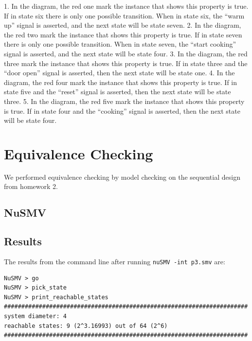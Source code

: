 \documentclass[11pt]{article}
\begin{document}
1. In the diagram, the red one mark the instance that shows this property is true. If in state six there is only one possible transition. When in state six, the “warm up” signal is asserted, and the next state will be state seven.
2. In the diagram, the red two mark the instance that shows this property is true. If in state seven there is only one possible transition. When in state seven, the “start cooking” signal is asserted, and the next state will be state four.
3. In the diagram, the red three mark the instance that shows this property is true. If in state three and the “door open” signal is asserted, then the next state will be state one.
4. In the diagram, the red four mark the instance that shows this property is true.  If in state five and the “reset” signal is asserted, then the next state will be state three.
5. In the diagram, the red five mark the instance that shows this property is true.  If in state four and the “cooking” signal is asserted, then the next state will be state four.
	
	

%

\section{Equivalence Checking} 
We performed equivalence checking by model checking on the sequential design from homework 2.
\subsection{NuSMV}
\subsection{Results}

The results from the command line after running \texttt{nuSMV -int p3.smv} are:
 \begin{lstlisting}[caption=NuSMV Interactive Output, label=p3_out]	
NuSMV > go
NuSMV > pick_state
NuSMV > print_reachable_states
######################################################################
system diameter: 4
reachable states: 9 (2^3.16993) out of 64 (2^6)
######################################################################
\end{lstlisting}



%  
\end{document}
